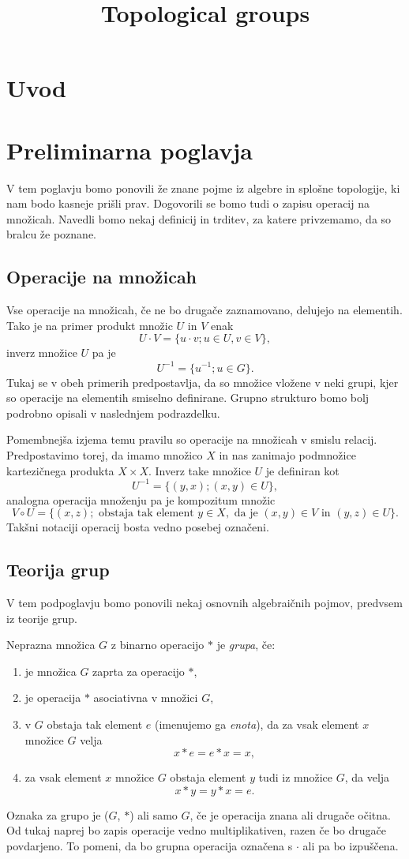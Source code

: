 \documentclass[mat1]{fmfdelo}
\title{Topological groups}
\begin{document}
\section{Uvod}

\section{Preliminarna poglavja}
V tem poglavju bomo ponovili že znane pojme iz algebre in splošne topologije, ki nam bodo kasneje prišli prav. Dogovorili se bomo tudi o zapisu operacij na množicah. Navedli bomo nekaj definicij in trditev, za katere privzemamo, da so bralcu že poznane.

\subsection{Operacije na množicah}\label{sec:opnamnozicah}
Vse operacije na množicah, če ne bo drugače zaznamovano, delujejo na elementih. Tako je na primer produkt množic $U$ in $V$ enak \[U \cdot V = \lbrace u \cdot v ; u \in U, v \in V \rbrace, \] inverz množice $U$ pa je \[ U^{-1} = \lbrace u^{-1} ; u \in G \rbrace. \] Tukaj se v obeh primerih predpostavlja, da so množice vložene v neki grupi, kjer so operacije na elementih smiselno definirane. Grupno strukturo bomo bolj podrobno opisali v naslednjem podrazdelku.

Pomembnejša izjema temu pravilu so operacije na množicah v smislu relacij. Predpostavimo torej, da imamo množico $X$ in nas zanimajo podmnožice kartezičnega produkta $X \times X$. Inverz take množice $U$ je definiran kot \[ U^{-1} = \lbrace (y, x) ; (x, y) \in U \rbrace, \]
analogna operacija množenju pa je kompozitum množic \[ V \circ U = \lbrace (x, z) ; \text{ obstaja tak element } y \in X, \text{ da je } (x, y) \in V \text{ in } (y, z) \in U \rbrace. \]
Takšni notaciji operacij bosta vedno posebej označeni.

\subsection{Teorija grup}
V tem podpoglavju bomo ponovili nekaj osnovnih algebraičnih pojmov, predvsem iz teorije grup.

Neprazna množica $G$ z binarno operacijo $*$ je \emph{grupa}, če:
\begin{enumerate}
\item je množica $G$ zaprta za operacijo $*$,
\item je operacija $*$ asociativna v množici $G$,
\item v $G$ obstaja tak element $e$ (imenujemo ga \emph{enota}), da za vsak element $x$ množice $G$ velja \[ x*e = e*x = x, \]
\item za vsak element $x$ množice $G$ obstaja element $y$ tudi iz množice $G$, da velja \[ x*y = y*x = e. \]
\end{enumerate}
Oznaka za grupo je ($G$, $*$) ali samo $G$, če je operacija znana ali drugače očitna. Od tukaj naprej bo zapis operacije vedno multiplikativen, razen če bo drugače povdarjeno. To pomeni, da bo grupna operacija označena s $\cdot$ ali pa bo izpuščena.
\end{document}
